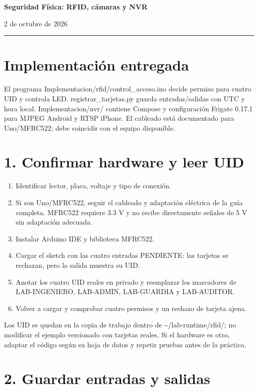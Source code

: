 \documentclass[12pt,a4paper]{article}
\begin{document}
{\LARGE\bfseries Seguridad Física: RFID, cámaras y NVR\par}\vspace{6pt}
2 de octubre de 2026\par\hrule\vspace{10pt}
\section*{Implementación entregada}
El programa \textnormal{Implementacion/\allowbreak{}rfid/\allowbreak{}control\_\allowbreak{}acceso.ino} decide permiso para cuatro UID y controla LED. \textnormal{registrar\_\allowbreak{}tarjetas.py} guarda entradas/salidas con UTC y hora local. \textnormal{Implementacion/\allowbreak{}nvr/\allowbreak{}} contiene Compose y configuración Frigate 0.17.1 para MJPEG Android y RTSP iPhone. El cableado está documentado para Uno/MFRC522; debe coincidir con el equipo disponible.\par
{}\section*{1. Confirmar hardware y leer UID}
\begin{enumerate}
\item Identificar lector, placa, voltaje y tipo de conexión.
\item Si son Uno/MFRC522, seguir el cableado y adaptación eléctrica de la guía completa. MFRC522 requiere 3.3 V y no recibe directamente señales de 5 V sin adaptación adecuada.
\item Instalar Arduino IDE y biblioteca MFRC522.
\item Cargar el sketch con las cuatro entradas PENDIENTE: las tarjetas se rechazan, pero la salida muestra su UID.
\item Anotar los cuatro UID reales en privado y reemplazar los marcadores de LAB-INGENIERO, LAB-ADMIN, LAB-GUARDIA y LAB-AUDITOR.
\item Volver a cargar y comprobar cuatro permisos y un rechazo de tarjeta ajena.
\end{enumerate}
Los UID se quedan en la copia de trabajo dentro de \textnormal{\textasciitilde{}/\allowbreak{}lab-runtime/\allowbreak{}rfid/\allowbreak{}}; no modificar el ejemplo versionado con tarjetas reales. Si el hardware es otro, adaptar el código según su hoja de datos y repetir pruebas antes de la práctica.\par
{}\section*{2. Guardar entradas y salidas}
\end{document}
